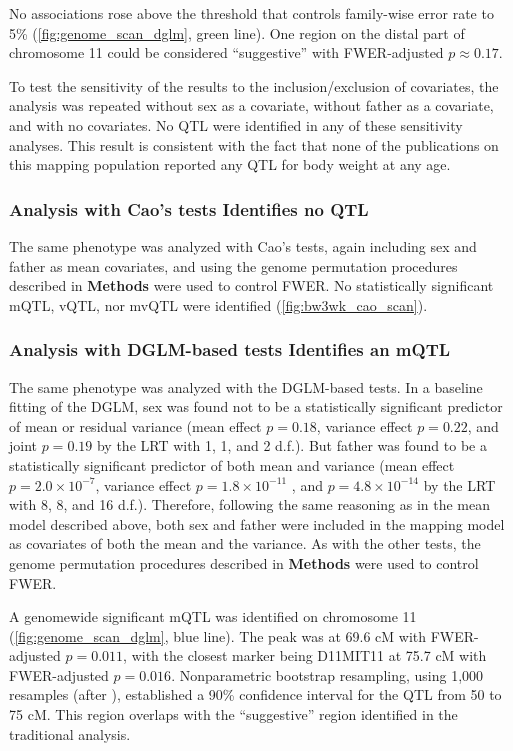No associations rose above the threshold that controls family-wise error rate to 5\% (\autoref{fig:genome_scan_dglm}, green line).
One region on the distal part of chromosome 11 could be considered ``suggestive'' with FWER-adjusted $p \approx 0.17$.

To test the sensitivity of the results to the inclusion/exclusion of covariates, the analysis was repeated without sex as a covariate, without father as a covariate, and with no covariates.
No QTL were identified in any of these sensitivity analyses.
This result is consistent with the fact that none of the publications on this mapping population reported any QTL for body weight at any age.

\subsubsection{Analysis with Cao's tests Identifies no QTL}
The same phenotype was analyzed with Cao's tests, again including sex and father as mean covariates, and using the genome permutation procedures described in \textbf{Methods} were used to control FWER.
No statistically significant mQTL, vQTL, nor mvQTL were identified (\autoref{fig:bw3wk_cao_scan}).

\subsubsection{Analysis with DGLM-based tests Identifies an mQTL}
The same phenotype was analyzed with the DGLM-based tests.
In a baseline fitting of the DGLM, sex was found not to be a statistically significant predictor of mean or residual variance (mean effect $p = 0.18$, variance effect $p = 0.22$, and joint $p = 0.19$ by the LRT with 1, 1, and 2 d.f.).
But father was found to be a statistically significant predictor of both mean and variance (mean effect $p = 2.0 \times 10^{-7}$, variance effect $p = 1.8 \times 10^{-11}$ , and $p = 4.8 \times 10^{-14}$ by the LRT with 8, 8, and 16 d.f.).
Therefore, following the same reasoning as in the mean model described above, both sex and father were included in the mapping model as covariates of both the mean and the variance.
As with the other tests, the genome permutation procedures described in \textbf{Methods} were used to control FWER.

A genomewide significant mQTL was identified on chromosome 11 (\autoref{fig:genome_scan_dglm}, blue line).
The peak was at 69.6 cM with FWER-adjusted $p=0.011$, with the closest marker being D11MIT11 at 75.7 cM with FWER-adjusted $p=0.016$.
Nonparametric bootstrap resampling, using 1,000 resamples (after \citealt{Visscher1996}), established a 90\% confidence interval for the QTL from 50 to 75 cM.
This region overlaps with the ``suggestive'' region identified in the traditional analysis.

